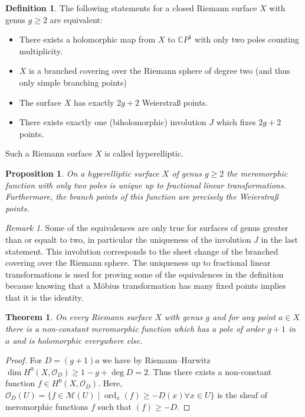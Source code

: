 \documentclass[a4paper]{article}
\newcommand{\CC}{\mathbb{C}}
\newcommand{\mcM}{\mathcal M}
\newcommand{\mcO}{\mathcal O}
\newcommand{\ord}{\operatorname{ord}}
\newtheorem*{thm}{Theorem}
\newtheorem*{prop}{Proposition}
\theoremstyle{definition}
\newtheorem*{definition}{Definition}
\theoremstyle{remark}
\newtheorem*{rmk}{Remark}
\theoremstyle{remark}
\begin{document}
\begin{definition}
The following statements for a closed Riemann surface $X$ with genus $g\geq 2$ are equivalent:
\begin{itemize}
\item There exists a holomorphic map from $X$ to $\CC P^1$ with only two poles counting multiplicity.
\item $X$ is a branched covering over the Riemann sphere of degree two (and thus only simple branching points)
\item The surface $X$ has exactly $2g+2$ Weierstraß points.
\item There exists exactly one (biholomorphic) involution $J$ which fixes $2g+2$ points.
\end{itemize}
Such a Riemann surface $X$ is called hyperelliptic.
\end{definition}

\begin{prop}
  On a hyperelliptic surface $X$ of genus $g\geq 2$ the meromorphic function with only two poles is unique up to fractional linear transformations. Furthermore, the branch points of this function are precisely the Weierstraß points.
\end{prop}

\begin{rmk}
  Some of the equivalences are only true for surfaces of genus greater than or equalt to two, in particular the uniqueness of the involution $J$ in the last statement. This involution corresponds to the sheet change of the branched covering over the Riemann sphere. The uniqueness up to fractional linear transformations is used for proving some of the equivalences in the definition because knowing that a Möbius transformation has many fixed points implies that it is the identity.
\end{rmk}

\begin{thm}
  On every Riemann surface $X$ with genus $g$ and for any point $a\in X$ there is a non-constant meromorphic function which has a pole of order $g+1$ in $a$ and is holomorphic everywhere else.
\end{thm}

\begin{proof}
  For $D=(g+1)a$ we have by Riemann--Hurwitz $\dim H^0(X,\mcO_D)\geq 1-g+\deg D=2$. Thus there exists a non-constant function $f\in H^0(X,\mcO_D)$. Here, $\mcO_D(U)=\{f\in\mcM(U)\mid\ord_x(f)\geq-D(x)\forall x\in U\}$ is the sheaf of meromorphic functions $f$ such that $(f)\geq-D$.
\end{proof}
\end{document}
